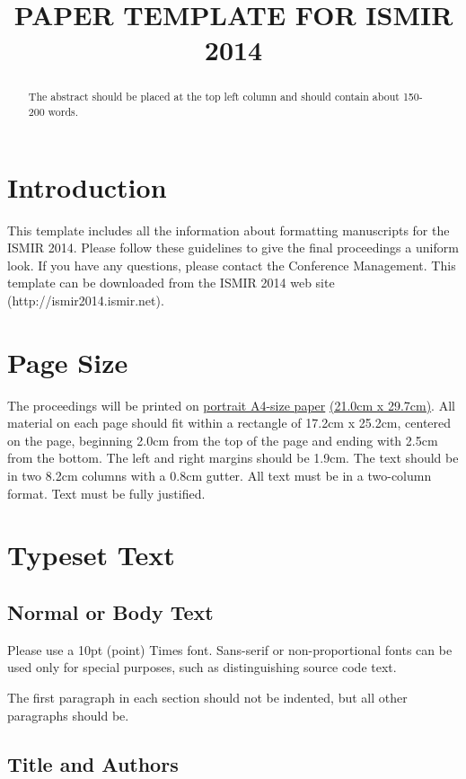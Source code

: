 \documentclass{article}
\title{PAPER TEMPLATE FOR ISMIR 2014}
\begin{document}
%
\maketitle
%
\begin{abstract}
The abstract should be placed at the top left column and should contain about 150-200 words.
\end{abstract}
%
\section{Introduction}\label{sec:introduction}

This template includes all the information about formatting manuscripts for the ISMIR 2014.
Please follow these guidelines to give the final proceedings a uniform look.
If you have any questions, please contact the Conference Management.
This template can be downloaded from the ISMIR 2014 web site (http://ismir2014.ismir.net).

\section{Page Size}\label{sec:page_size}

The proceedings will be printed on
 \underline{portrait A4-size paper} \underline{(21.0cm x 29.7cm)}.
All material on each page should fit within a rectangle of 17.2cm x 25.2cm,
centered on the page, beginning 2.0cm
from the top of the page and ending with 2.5cm from the bottom.
The left and right margins should be 1.9cm.
The text should be in two 8.2cm columns with a 0.8cm gutter.
All text must be in a two-column format.
Text must be fully justified.

\section{Typeset Text}\label{sec:typeset_text}

\subsection{Normal or Body Text}\label{subsec:body}

Please use a 10pt (point) Times font. Sans-serif or non-proportional fonts
can be used only for special purposes, such as distinguishing source code text.

The first paragraph in each section should not be indented, but all other paragraphs should be.

\subsection{Title and Authors}
\end{document}
